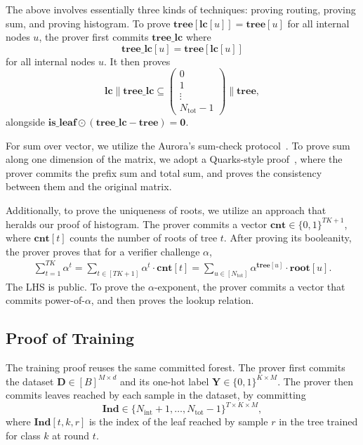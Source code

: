 The above involves essentially three kinds of techniques:
  proving routing, proving sum,
  and proving histogram.
  To prove $\mathbf{tree}[\mathbf{lc}[u]]=\mathbf{tree}[u]$ for all internal nodes $u$, the prover first
  commits $\mathbf{tree\_lc}$ where
  \[\mathbf{tree\_lc}[u] = \mathbf{tree}[\mathbf{lc}[u]]\]
  for all internal nodes $u$.
  It then proves
  \[
    \mathbf{lc}\|\mathbf{tree\_lc} \subseteq \left(\begin{matrix}
    0\\ 1\\ \vdots\\ N_{\mathrm{tot}}-1
    \end{matrix}\right)\|\mathbf{tree},
  \]
  alongside $\mathbf{is\_leaf}\odot(\mathbf{tree\_lc} - \mathbf{tree}) = \mathbf{0}$.

For sum over vector, we utilize the Aurora's sum-check protocol~\cite{aurora19}.
  To prove sum along one dimension of the matrix,
  we adopt a Quarks-style proof~\cite{quarks20},
  where the prover commits the prefix sum and total sum, 
  and proves the consistency between them and the original matrix.

Additionally, to prove the uniqueness of roots, we utilize
an approach that heralds our proof of histogram.
The prover commits a vector $\mathbf{cnt}\in \{0, 1\}^{TK+1}$, where $\mathbf{cnt}[t]$ counts the number of roots of tree $t$.
After proving its booleanity, the prover proves that
for a verifier challenge $\alpha$, 
\begin{align}
  \sum_{t=1}^{TK}\alpha^t = \sum_{t\in [TK+1]} \alpha^t\cdot \mathbf{cnt}[t] = \sum_{u\in [N_{\mathrm{tot}}]} \alpha^{\mathbf{tree}[u]}\cdot \mathbf{root}[u].
\end{align}
The LHS is public.
To prove the $\alpha$-exponent, the prover commits a vector
that commits power-of-$\alpha$, and then proves the lookup relation.

\subsection{Proof of Training}

The training proof reuses the same committed forest. 
The prover first commits the dataset $\mathbf{D}\in [B]^{M\times d}$ and 
its one-hot label $\mathbf{Y}\in \{0, 1\}^{K\times M}$.
The prover then commits leaves reached by each sample in the dataset,
by committing
\[
\mathbf{Ind} \in
\{N_{\mathrm{int}}+1,\ldots,N_{\mathrm{tot}}-1\}^{T\times K\times M},
\]
where $\mathbf{Ind}[t, k, r]$ 
is the index of the leaf reached by sample
$r$ in the tree trained for class $k$ at round $t$.


